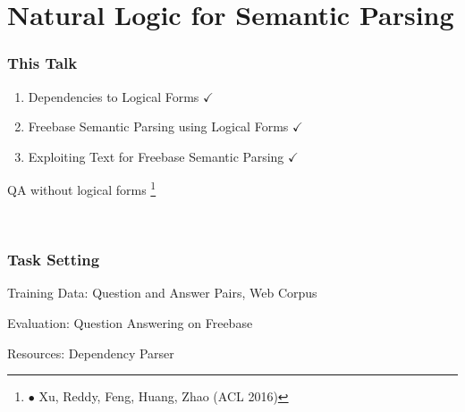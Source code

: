 \documentclass[mathserif,12pt]{beamer}
\newcommand\blfootnote[1]{%
  \begingroup
  \renewcommand\thefootnote{}\footnote{#1}%
  \addtocounter{footnote}{-1}%
  \endgroup
}
\newcommand{\hlight}[1]{{\color{blue!80} #1}}
\begin{document}
\section{Natural Logic for Semantic Parsing}
\begin{frame}
\frametitle{This Talk}
\large 
\begin{enumerate}
 \item Dependencies to Logical Forms $\checkmark$
 
 \vspace{2em}
 \item Freebase Semantic Parsing using Logical Forms $\checkmark$
 
 \vspace{2em}
 \item Exploiting Text for Freebase Semantic Parsing $\checkmark$
\end{enumerate}
\end{frame}

\begin{frame}
\Large
\vspace{1.5em}
QA without logical forms \blfootnote{\color{blue} 
  $\bullet$ Xu, Reddy, Feng, Huang, Zhao (ACL 2016)} \\
\end{frame}

\begin{frame}
\frametitle{Task Setting}
\large

\hlight{Training Data:} Question and Answer Pairs, Web Corpus

\vspace{2em}
\hlight{Evaluation:} Question Answering on Freebase

\vspace{2em}
\hlight{Resources:} Dependency Parser
\end{frame}
\end{document}
